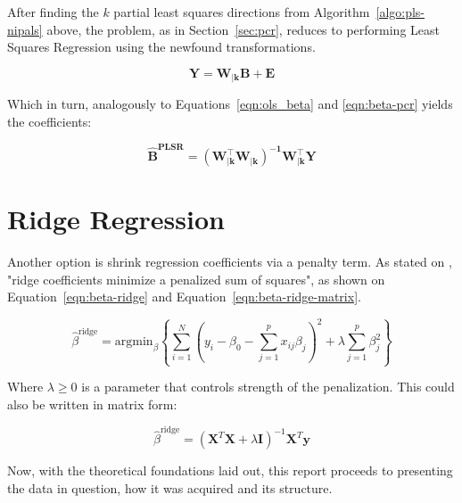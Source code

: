 After finding the $k$ partial least squares directions from Algorithm~\ref{algo:pls-nipals} above, the problem, as in Section~\ref{sec:pcr}, reduces to performing Least Squares Regression using the newfound transformations.

	\begin{equation}
	\label{eqn:plsr}
	\mathbf{Y = W_{|k} B + E}
\end{equation}

Which in turn, analogously to Equations~\ref{eqn:ols_beta} and \ref{eqn:beta-pcr} yields the coefficients:

\begin{equation}
	\label{eqn:beta-plsr}
	\mathbf{\hat{B}^{\text{PLSR}} = (W_{|k}^\intercal W_{|k})^{-1}W_{|k}^\intercal Y}
\end{equation}



\section{Ridge Regression}
\label{sec:ridge}

Another option is shrink regression coefficients via a penalty term. As stated on \parencite{friedman2001}, "ridge coefficients minimize a penalized sum of squares", as shown on Equation~\ref{eqn:beta-ridge} and Equation~\ref{eqn:beta-ridge-matrix}.

\begin{equation}
	\label{eqn:beta-ridge}
	\hat{\beta}^{\text{ridge}} = \text{argmin}_\beta \left\{ \sum_{i=1}^{N}(y_i - \beta_0 - \sum_{j=1}^{p} x_{ij}\beta_j)^2 + \lambda \sum_{j=1}^{p} \beta_j^2 \right\}
\end{equation}

Where $\lambda \geq 0$ is a parameter that controls strength of the penalization. This could also be written in matrix form:

\begin{equation}
	\label{eqn:beta-ridge-matrix}
	\hat{\beta}^{\text{ridge}} = (\mathbf{X}^T \mathbf{X} + \lambda \mathbf{I})^{-1} \mathbf{X}^T\mathbf{y}
\end{equation}

Now, with the theoretical foundations laid out, this report proceeds to presenting the data in question, how it was acquired and its structure.



